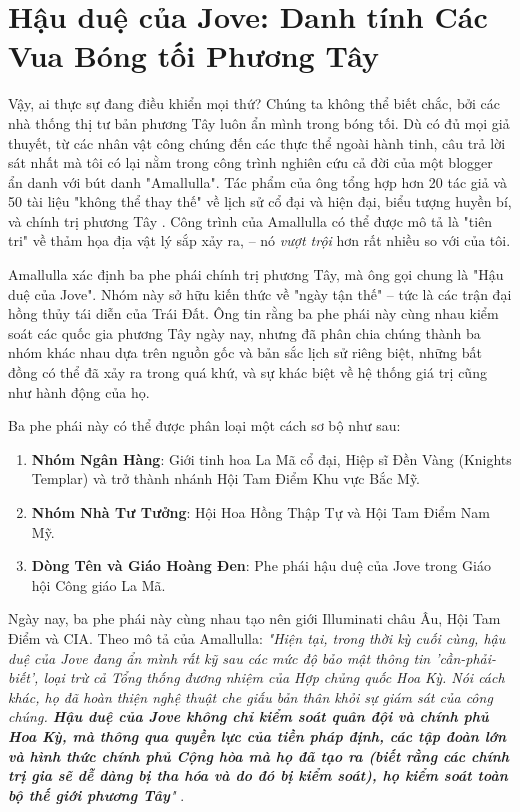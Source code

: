 \section{Hậu duệ của Jove: Danh tính Các Vua Bóng tối Phương Tây}

Vậy, ai thực sự đang điều khiển mọi thứ? Chúng ta không thể biết chắc, bởi các nhà thống thị tư bản phương Tây luôn ẩn mình trong bóng tối. Dù có đủ mọi giả thuyết, từ các nhân vật công chúng đến các thực thể ngoài hành tinh, câu trả lời sát nhất mà tôi có lại nằm trong công trình  nghiên cứu cả đời của một blogger ẩn danh với bút danh "Amallulla". Tác phẩm của ông tổng hợp hơn 20 tác giả và 50 tài liệu "không thể thay thế" về lịch sử cổ đại và hiện đại, biểu tượng huyền bí, và chính trị phương Tây \cite{33,34}. Công trình của Amallulla có thể được mô tả là "tiên tri" về thảm họa địa vật lý sắp xảy ra, – nó \textit{vượt trội} hơn rất nhiều so với của tôi.

Amallulla xác định ba phe phái chính trị phương Tây, mà ông gọi chung là "Hậu duệ của Jove". Nhóm này sở hữu kiến thức về "ngày tận thế" – tức là các trận đại hồng thủy tái diễn của Trái Đất. Ông tin rằng ba phe phái này cùng nhau kiểm soát các quốc gia phương Tây ngày nay, nhưng đã phân chia chúng thành ba nhóm khác nhau dựa trên nguồn gốc và bản sắc lịch sử riêng biệt, những bất đồng có thể đã xảy ra trong quá khứ, và sự khác biệt về hệ thống giá trị cũng như hành động của họ.

Ba phe phái này có thể được phân loại một cách sơ bộ như sau:

\begin{flushleft}
\begin{enumerate}
    \item \textbf{Nhóm Ngân Hàng}: Giới tinh hoa La Mã cổ đại, Hiệp sĩ Đền Vàng (Knights Templar) và trở thành nhánh Hội Tam Điểm Khu vực Bắc Mỹ.
    \item \textbf{Nhóm Nhà Tư Tưởng}: Hội Hoa Hồng Thập Tự và Hội Tam Điểm Nam Mỹ.
    \item \textbf{Dòng Tên và Giáo Hoàng Đen}: Phe phái hậu duệ của Jove trong Giáo hội Công giáo La Mã.
\end{enumerate}
\end{flushleft}

Ngày nay, ba phe phái này cùng nhau tạo nên giới Illuminati châu Âu, Hội Tam Điểm và CIA. Theo mô tả của Amallulla: \textit{"Hiện tại, trong thời kỳ cuối cùng, hậu duệ của Jove đang ẩn mình rất kỹ sau các mức độ bảo mật thông tin 'cần-phải-biết', loại trừ cả Tổng thống đương nhiệm của Hợp chủng quốc Hoa Kỳ. Nói cách khác, họ đã hoàn thiện nghệ thuật che giấu bản thân khỏi sự giám sát của công chúng. \textbf{Hậu duệ của Jove không chỉ kiểm soát quân đội và chính phủ Hoa Kỳ, mà thông qua quyền lực của tiền pháp định, các tập đoàn lớn và hình thức chính phủ Cộng hòa mà họ đã tạo ra (biết rằng các chính trị gia sẽ dễ dàng bị tha hóa và do đó bị kiểm soát), họ kiểm soát toàn bộ thế giới phương Tây}"} \cite{33,34}.

